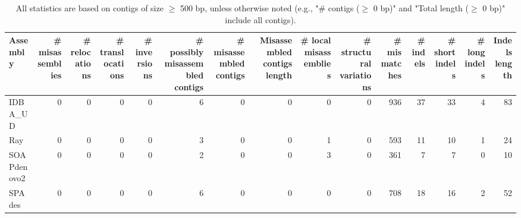 \documentclass[12pt,a4paper]{article}
\begin{document}
\begin{table}[ht]
\begin{center}
\caption{All statistics are based on contigs of size $\geq$ 500 bp, unless otherwise noted (e.g., "\# contigs ($\geq$ 0 bp)" and "Total length ($\geq$ 0 bp)" include all contigs).}
\begin{tabular}{|l*{14}{|r}|}
\hline
Assembly & \# misassemblies &     \# relocations &     \# translocations &     \# inversions & \# possibly misassembled contigs & \# misassembled contigs & Misassembled contigs length & \# local misassemblies & \# structural variations & \# mismatches & \# indels &     \# short indels &     \# long indels & Indels length \\ \hline
IDBA\_UD & 0 & 0 & 0 & 0 & 6 & 0 & 0 & 0 & 0 & 936 & 37 & 33 & 4 & 83 \\ \hline
Ray & 0 & 0 & 0 & 0 & 3 & 0 & 0 & 1 & 0 & 593 & 11 & 10 & 1 & 24 \\ \hline
SOAPdenovo2 & 0 & 0 & 0 & 0 & 2 & 0 & 0 & 3 & 0 & 361 & 7 & 7 & 0 & 10 \\ \hline
SPAdes & 0 & 0 & 0 & 0 & 6 & 0 & 0 & 0 & 0 & 708 & 18 & 16 & 2 & 52 \\ \hline
\end{tabular}
\end{center}
\end{table}
\end{document}
